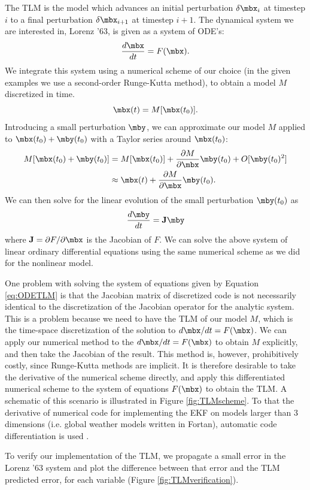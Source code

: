 The TLM is the model which advances an initial perturbation $\delta \mbx_{i}$ at timestep $i$ to a final perturbation $\delta \mbx_{i+1}$ at timestep $i+1$.
The dynamical system we are interested in, Lorenz '63, is given as a system of ODE's:
\[ \frac{d\mbx}{dt} = F(\mbx) .\]
We integrate this system using a numerical scheme of our choice (in the given examples we use a second-order Runge-Kutta method), to obtain a model $M$ discretized in time.
\[ \mbx(t) = M[ \mbx(t_0) ] .\]
Introducing a small perturbation $\mby$, we can approximate our model $M$ applied to $\mbx(t_0) + \mby(t_0)$ with a Taylor series around $\mbx(t_0)$:
\begin{align*} M[ \mbx(t_0) + \mby(t_0) ] &= M [ \mbx(t_0) ] + \frac{\partial M}{\partial \mbx} \mby(t_0) + O [ \mby(t_0) ^2 ]\\ &\approx \mbx(t) + \frac{\partial M}{\partial \mbx} \mby(t_0) .\end{align*}
We can then solve for the linear evolution of the small perturbation $\mby(t_0)$ as 
\begin{equation} \frac{d\mby }{dt } = \mathbf{J} \mby \label{eq:ODETLM} \end{equation}
where $\mathbf{J} = \partial F / \partial \mbx$ is the Jacobian of $F$.
We can solve the above system of linear ordinary differential equations using the same numerical scheme as we did for the nonlinear model.

One problem with solving the system of equations given by Equation \ref{eq:ODETLM} is that the Jacobian matrix of discretized code is not necessarily identical to the discretization of the Jacobian operator for the analytic system.
This is a problem because we need to have the TLM of our model $M$, which is the time-space discretization of the solution to $d\mbx/dt = F(\mbx)$.
We can apply our numerical method to the $d\mbx/dt = F(\mbx)$ to obtain $M$ explicitly, and then take the Jacobian of the result.
This method is, however, prohibitively costly, since Runge-Kutta methods are implicit.
It is therefore desirable to take the derivative of the numerical scheme directly, and apply this differentiated numerical scheme to the system of equations $F(\mbx)$ to obtain the TLM.
A schematic of this scenario is illustrated in Figure \ref{fig:TLMscheme}.
To that the derivative of numerical code for implementing the EKF on models larger than 3 dimensions (i.e. global weather models written in Fortan), automatic code differentiation is used \cite{autodiff1981}.

To verify our implementation of the TLM, we propagate a small error in the Lorenz '63 system and plot the difference between that error and the TLM predicted error, for each variable (Figure \ref{fig:TLMverification}).

